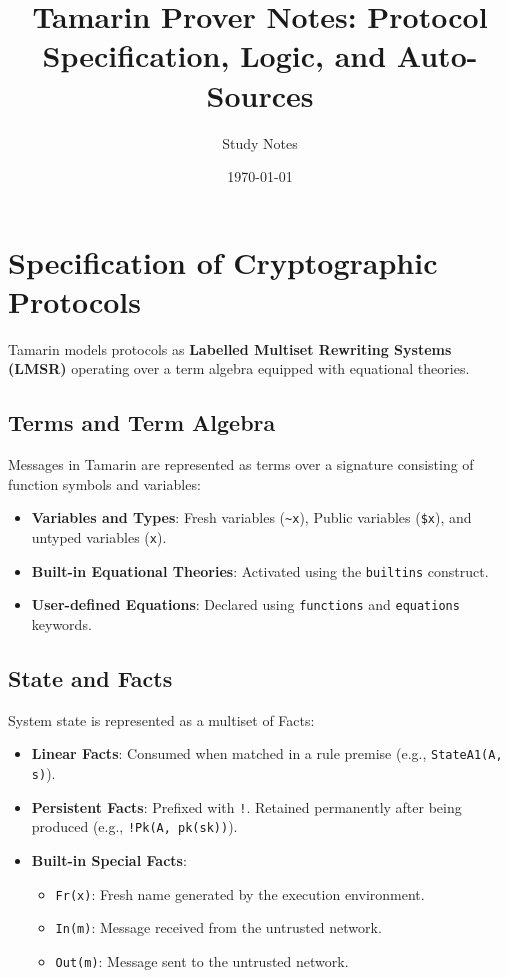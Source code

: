 \documentclass[11pt,a4paper]{article}
\title{\textbf{Tamarin Prover Notes: Protocol Specification, Logic, and Auto-Sources}}
\author{Study Notes}
\date{\today}
\begin{document}
\maketitle

\section{Specification of Cryptographic Protocols}

Tamarin models protocols as \textbf{Labelled Multiset Rewriting Systems (LMSR)} operating over a term algebra equipped with equational theories.

\subsection{Terms and Term Algebra}
Messages in Tamarin are represented as terms over a signature consisting of function symbols and variables:
\begin{itemize}
    \item \textbf{Variables and Types}: Fresh variables (\texttt{\textasciitilde x}), Public variables (\texttt{\$x}), and untyped variables (\texttt{x}).
    \item \textbf{Built-in Equational Theories}: Activated using the \texttt{builtins} construct.
    \item \textbf{User-defined Equations}: Declared using \texttt{functions} and \texttt{equations} keywords.
\end{itemize}

\subsection{State and Facts}
System state is represented as a multiset of Facts:
\begin{itemize}
    \item \textbf{Linear Facts}: Consumed when matched in a rule premise (e.g., \texttt{StateA1(A, s)}).
    \item \textbf{Persistent Facts}: Prefixed with \texttt{!}. Retained permanently after being produced (e.g., \texttt{!Pk(A, pk(sk))}).
    \item \textbf{Built-in Special Facts}:
    \begin{itemize}
        \item \texttt{Fr(x)}: Fresh name generated by the execution environment.
        \item \texttt{In(m)}: Message received from the untrusted network.
        \item \texttt{Out(m)}: Message sent to the untrusted network.
    \end{itemize}
\end{itemize}
\end{document}
